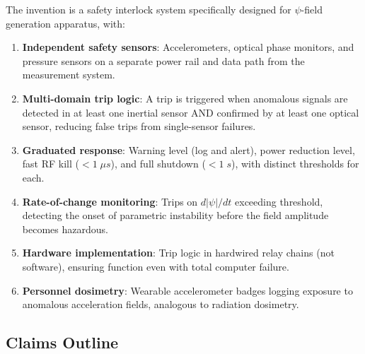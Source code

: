 \documentclass[11pt,a4paper]{article}
\begin{document}
The invention is a safety interlock system specifically designed
for $\psi$-field generation apparatus, with:

\begin{enumerate}[nosep]
\item \textbf{Independent safety sensors}: Accelerometers, optical
phase monitors, and pressure sensors on a separate power rail
and data path from the measurement system.

\item \textbf{Multi-domain trip logic}: A trip is triggered when
anomalous signals are detected in at least one inertial sensor
AND confirmed by at least one optical sensor, reducing false
trips from single-sensor failures.

\item \textbf{Graduated response}: Warning level (log and alert),
power reduction level, fast RF kill ($< 1\;\si{\mu s}$), and
full shutdown ($< 1\;\si{s}$), with distinct thresholds for
each.

\item \textbf{Rate-of-change monitoring}: Trips on $d|\psi|/dt$
exceeding threshold, detecting the onset of parametric
instability before the field amplitude becomes hazardous.

\item \textbf{Hardware implementation}: Trip logic in hardwired
relay chains (not software), ensuring function even with total
computer failure.

\item \textbf{Personnel dosimetry}: Wearable accelerometer
badges logging exposure to anomalous acceleration fields,
analogous to radiation dosimetry.
\end{enumerate}

\subsection{Claims Outline}
\end{document}
